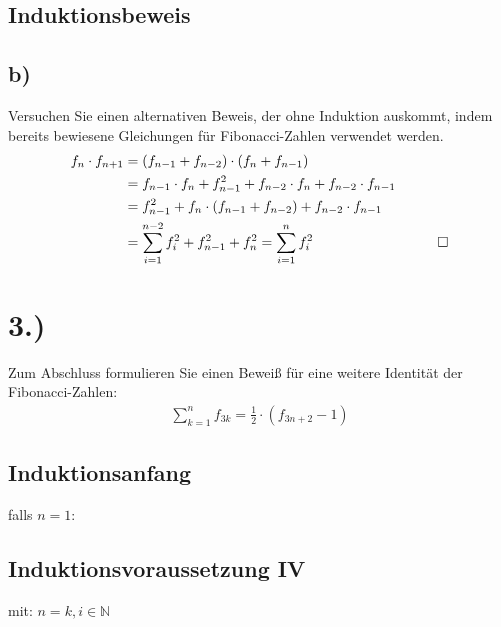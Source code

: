 \documentclass[titlepage]{article}
\begin{document}
			\subsection*{Induktionsbeweis}
		\subsection*{b)}Versuchen Sie einen alternativen Beweis, der ohne Induktion auskommt, indem bereits bewiesene Gleichungen für Fibonacci-Zahlen verwendet werden.
			\begin{align*}
				f_n\cdot f_{n+1} &=(f_{n-1}+f_{n-2})\cdot(f_n+f_{n-1})\\
				&=f_{n-1}\cdot f_n+f^2_{n-1}+f_{n-2}\cdot f_n+f_{n-2}\cdot f_{n-1}\\
				&=f^2_{n-1}+f_n\cdot(f_{n-1}+f_{n-2})+f_{n-2}\cdot f_{n-1}\\
				&=\sum^{n-2}_{i=1}f^2_i+f^2_{n-1}+f^2_n=\sum^n_{i=1}f^2_i&\qed
			\end{align*}
	\section*{3.)} Zum Abschluss formulieren Sie einen Beweiß für eine weitere Identität der Fibonacci-Zahlen:
		\begin{align*}
			\sum^n_{k=1}f_{3k}=\frac{1}{2}\cdot(f_{3n+2}-1)
		\end{align*}
					\subsection*{Induktionsanfang} falls $n=1$:\\
		\subsection*{Induktionsvoraussetzung IV}
		mit: $n=k,i\in\mathbb{N}$\\
\end{document}
